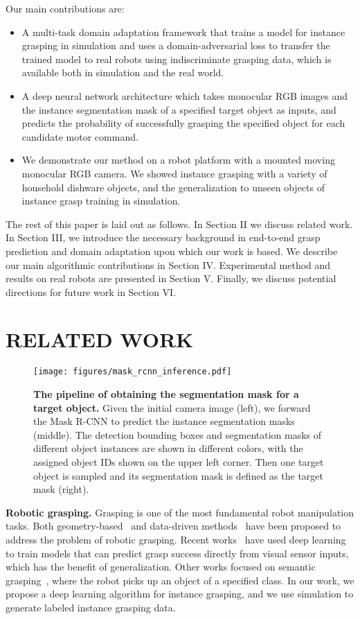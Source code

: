 \documentclass[letterpaper, 10 pt, conference]{ieeeconf}  %
\begin{document}
Our main contributions are:
\begin{itemize}
    \item A multi-task domain adaptation framework that trains a model for instance grasping in simulation and uses a domain-adversarial loss to transfer the trained model to real robots using indiscriminate grasping data, which is available both in simulation and the real world.
    \item A deep neural network architecture which takes monocular RGB images and the instance segmentation mask of a specified target object as inputs, and predicts the probability of successfully grasping the specified object for each candidate motor command.
    \item We demonstrate our method on a robot platform with a mounted moving monocular RGB camera. We showed instance grasping with a variety of household dishware objects, and the generalization to unseen objects of instance grasp training in simulation.
\end{itemize}

The rest of this paper is laid out as follows. In Section II we discuss related work. In Section III, we introduce the necessary background in end-to-end grasp prediction and domain adaptation upon which our work is based. We describe our main algorithmic contributions in Section IV. Experimental method and results on real robots are presented in Section V. Finally, we discuss potential directions for future work in Section VI.

\section{RELATED WORK}\begin{figure*}[ht]
\centering
\texttt{[image: figures/mask\_rcnn\_inference.pdf]}
\caption{\textbf{The pipeline of obtaining the segmentation mask for a target object.} Given the initial camera image (left), we forward the Mask R-CNN to predict the instance segmentation masks (middle). The detection bounding boxes and segmentation masks of different object instances are shown in different colors, with the assigned object IDs shown on the upper left corner. Then one target object is sampled and its segmentation mask is defined as the target mask (right).}
\label{fig:mask_rcnn_pipeline}
\vspace{-6mm}
\end{figure*}\textbf{Robotic grasping.} Grasping is one of the most fundamental robot manipulation tasks. Both geometry-based~\cite{force_closure_1995,caging_servey,bai2014dexterous} and data-driven methods~\cite{bohg2014data} have been proposed to address the problem of robotic grasping. Recent works~\cite{levine2016learning,gupta} have used deep learning to train models that can predict grasp success directly from visual sensor inputs, which has the benefit of generalization. Other works focused on semantic grasping~\cite{jang2017end}, where the robot picks up an object of a specified class. In our work, we propose a deep learning algorithm for instance grasping, and we use simulation to generate labeled instance grasping data.
\end{document}
